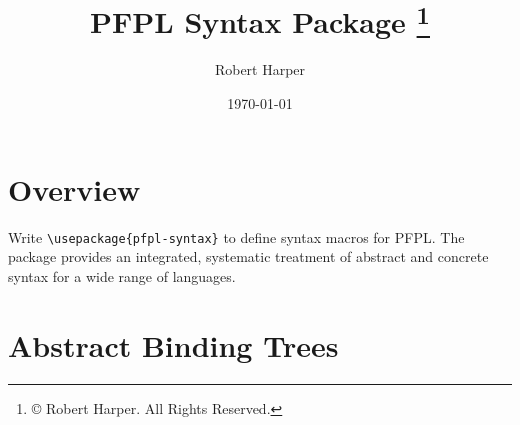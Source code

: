 \documentclass[11pt]{article}
\title{\textsf{PFPL} Syntax Package%
\footnote{\copyright{} \the\year{} Robert Harper.  All Rights Reserved.}}
\author{Robert Harper}
\date{\today}
\begin{document}
\maketitle{}

\section*{Overview\footnotemark}

Write \verb|\usepackage{pfpl-syntax}| to define syntax macros for \textsf{PFPL}.  The package provides an integrated, systematic treatment of abstract and concrete syntax for a wide range of languages.


\section*{Abstract Binding Trees}
\end{document}
